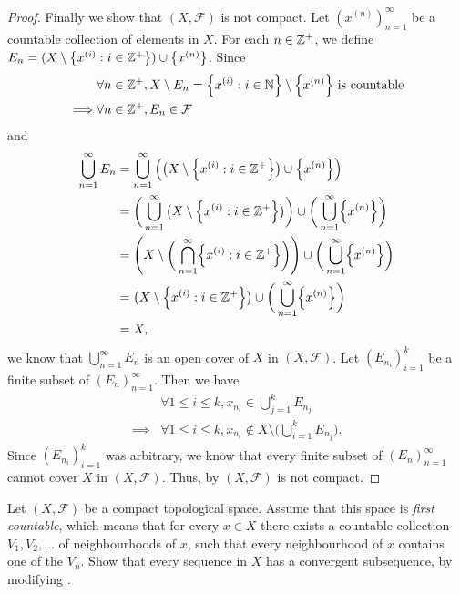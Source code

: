 \begin{proof}
  Finally we show that \((X, \mathcal{F})\) is not compact.
  Let \((x^{(n)})_{n = 1}^\infty\) be a countable collection of elements in \(X\).
  For each \(n \in \mathbb{Z}^+\), we define \(E_n = (X \setminus \left\lbrace x^{(i)} : i \in \mathbb{Z}^+\right\rbrace) \cup \left\lbrace x^{(n)}\right\rbrace\).
  Since
  \begin{align*}
             & \forall n \in \Z^+, X \setminus E_n = \set{x^{(i)} : i \in \N} \setminus \set{x^{(n)}} \text{ is countable} \\
    \implies & \forall n \in \Z^+, E_n \in \mathcal{F}
  \end{align*}
  and
  \begin{align*}
    \bigcup_{n = 1}^\infty E_n & = \bigcup_{n = 1}^\infty \Big(\big(X \setminus \set{x^{(i)} : i \in \Z^+}\big) \cup \set{x^{(n)}}\Big)                                        \\
                               & = \bigg(\bigcup_{n = 1}^\infty \big(X \setminus \set{x^{(i)} : i \in \Z^+}\big)\bigg) \cup \bigg(\bigcup_{n = 1}^\infty \set{x^{(n)}}\bigg)   \\
                               & = \Bigg(X \setminus \bigg(\bigcap_{n = 1}^\infty \set{x^{(i)} : i \in \Z^+}\bigg)\Bigg) \cup \bigg(\bigcup_{n = 1}^\infty \set{x^{(n)}}\bigg) \\
                               & = \big(X \setminus \set{x^{(i)} : i \in \Z^+}\big) \cup \bigg(\bigcup_{n = 1}^\infty \set{x^{(n)}}\bigg)                                      \\
                               & = X,
  \end{align*}
  we know that \(\bigcup_{n = 1}^\infty E_n\) is an open cover of \(X\) in \((X, \mathcal{F})\).
  Let \((E_{n_i})_{i = 1}^k\) be a finite subset of \((E_n)_{n = 1}^\infty\).
  Then we have
  \begin{align*}
             & \forall 1 \leq i \leq k, x_{n_i} \in \bigcup_{j = 1}^k E_{n_j}                             \\
    \implies & \forall 1 \leq i \leq k, x_{n_i} \notin X \setminus \bigg(\bigcup_{i = 1}^k E_{n_j}\bigg).
  \end{align*}
  Since \((E_{n_i})_{i = 1}^k\) was arbitrary, we know that every finite subset of \((E_n)_{n = 1}^\infty\) cannot cover \(X\) in \((X, \mathcal{F})\).
  Thus, by  \((X, \mathcal{F})\) is not compact.
\end{proof}

\setcounter{ex}{8}
\begin{ex}\label{ii:ex:2.5.9}
  Let \((X, \mathcal{F})\) be a compact topological space.
  Assume that this space is \emph{first countable}, which means that for every \(x \in X\) there exists a countable collection \(V_1 , V_2 , \dots\) of neighbourhoods of \(x\), such that every neighbourhood of \(x\) contains one of the \(V_n\).
  Show that every sequence in \(X\) has a convergent subsequence, by modifying .
\end{ex}

